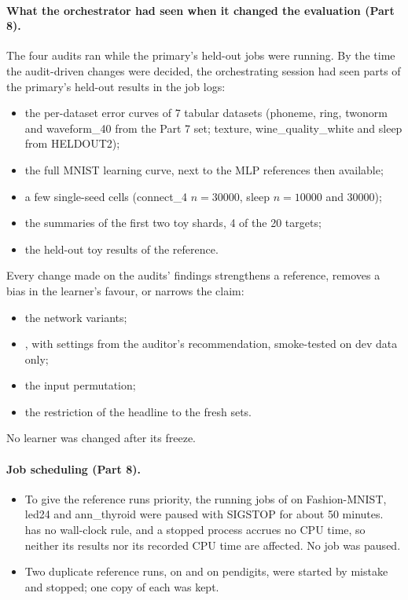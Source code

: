 \paragraph{What the orchestrator had seen when it changed the evaluation (Part 8).} The four audits ran while the primary's held-out jobs were running. By the time the audit-driven changes were decided, the orchestrating session had seen parts of the primary's held-out results in the job logs:
\begin{itemize}
\item the per-dataset error curves of 7 tabular datasets (phoneme, ring, twonorm and waveform\_40 from the Part 7 set; texture, wine\_quality\_white and sleep from HELDOUT2);
\item the full MNIST learning curve, next to the MLP references then available;
\item a few single-seed cells (connect\_4 $n=30000$, sleep $n=10000$ and 30000);
\item the summaries of the first two  toy shards, 4 of the 20 targets;
\item the held-out toy results of the  reference.
\end{itemize}
Every change made on the audits' findings strengthens a reference, removes a bias in the learner's favour, or narrows the claim:
\begin{itemize}
\item the network variants;
\item {}, with settings from the auditor's recommendation, smoke-tested on dev data only;
\item the input permutation;
\item the restriction of the headline to the fresh sets.
\end{itemize}
No learner was changed after its freeze.

\paragraph{Job scheduling (Part 8).}
\begin{itemize}
\item To give the reference runs priority, the running jobs of  on Fashion-MNIST, led24 and ann\_thyroid were paused with SIGSTOP for about 50 minutes.  has no wall-clock rule, and a stopped process accrues no CPU time, so neither its results nor its recorded CPU time are affected. No  job was paused.
\item Two duplicate reference runs,  on  and  on pendigits, were started by mistake and stopped; one copy of each was kept.
\end{itemize}


